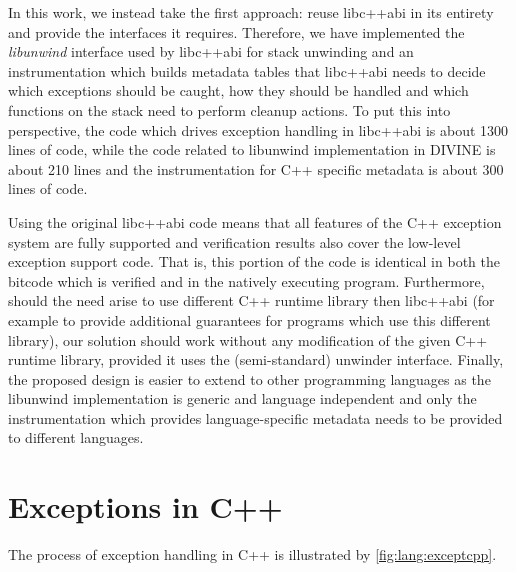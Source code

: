 In this work, we instead take the first approach: reuse
libc++abi in its entirety and provide the interfaces it
requires. Therefore, we have implemented the \emph{libunwind}
interface used by libc++abi for stack unwinding and an \llvm{}
instrumentation which builds metadata tables that libc++abi
needs to decide which exceptions should be caught, how they should be
handled and which functions on the stack need to perform cleanup
actions.
To put this into perspective, the code which drives exception handling in libc++abi is about 1300 lines of code, while the code related to libunwind implementation in DIVINE is about 210 lines and the instrumentation for C++ specific metadata is about 300 lines of code.

Using the original libc++abi code means that all features of
the C++ exception system are fully supported and verification results
also cover the low-level exception support code. That is, this portion
of the code is identical in both the bitcode which is verified and in
the natively executing program.
Furthermore, should the need arise to use different C++ runtime library then
libc++abi (for example to provide additional guarantees for programs
which use this different library), our solution should work without any
modification of the given C++ runtime library, provided it uses the
(semi-standard) unwinder interface.
Finally, the proposed design is easier to extend to other programming
languages as the libunwind implementation is generic and language
independent and only the instrumentation which provides language-specific
metadata needs to be provided to different languages.

\section{Exceptions in C++}\label{sec:exceptions}

The process of exception handling in C++ is illustrated by \autoref{fig:lang:exceptcpp}.

